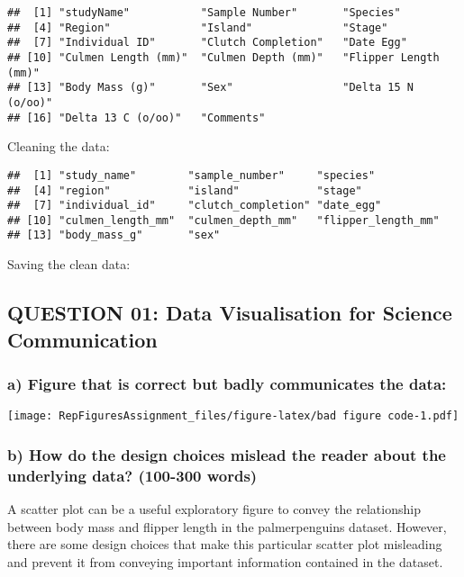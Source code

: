 \documentclass[
]{article}
\begin{document}
\begin{verbatim}
##  [1] "studyName"           "Sample Number"       "Species"            
##  [4] "Region"              "Island"              "Stage"              
##  [7] "Individual ID"       "Clutch Completion"   "Date Egg"           
## [10] "Culmen Length (mm)"  "Culmen Depth (mm)"   "Flipper Length (mm)"
## [13] "Body Mass (g)"       "Sex"                 "Delta 15 N (o/oo)"  
## [16] "Delta 13 C (o/oo)"   "Comments"
\end{verbatim}

Cleaning the data:

\begin{verbatim}
##  [1] "study_name"        "sample_number"     "species"          
##  [4] "region"            "island"            "stage"            
##  [7] "individual_id"     "clutch_completion" "date_egg"         
## [10] "culmen_length_mm"  "culmen_depth_mm"   "flipper_length_mm"
## [13] "body_mass_g"       "sex"
\end{verbatim}

Saving the clean data:

\subsection{QUESTION 01: Data Visualisation for Science
Communication}\label{question-01-data-visualisation-for-science-communication}

\subsubsection{a) Figure that is correct but badly communicates the
data:}\label{a-figure-that-is-correct-but-badly-communicates-the-data}

\texttt{[image: RepFiguresAssignment\_files/figure-latex/bad figure code-1.pdf]}

\subsubsection{b) How do the design choices mislead the reader about the
underlying data? (100-300
words)}\label{b-how-do-the-design-choices-mislead-the-reader-about-the-underlying-data-100-300-words}

A scatter plot can be a useful exploratory figure to convey the
relationship between body mass and flipper length in the palmerpenguins
dataset. However, there are some design choices that make this
particular scatter plot misleading and prevent it from conveying
important information contained in the dataset.
\end{document}
